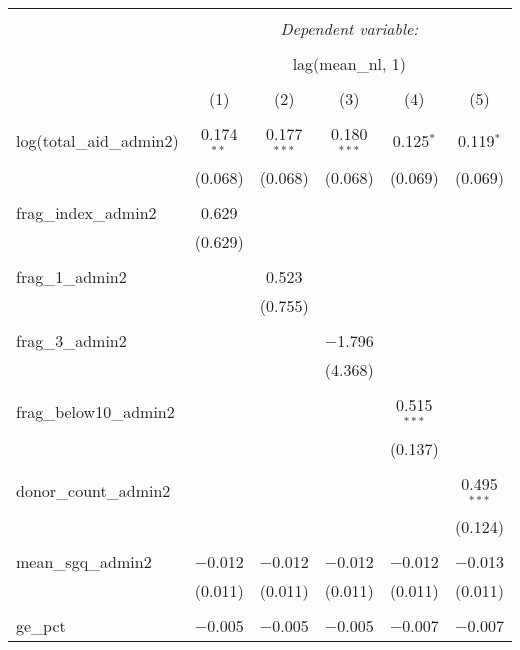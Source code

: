 
\begin{table}[!htbp] \centering 
  \caption{} 
  \label{} 
\begin{tabular}{@{\extracolsep{5pt}}lccccc} 
\\[-1.8ex]\hline 
\hline \\[-1.8ex] 
 & \multicolumn{5}{c}{\textit{Dependent variable:}} \\ 
\cline{2-6} 
\\[-1.8ex] & \multicolumn{5}{c}{lag(mean\_nl, 1)} \\ 
\\[-1.8ex] & (1) & (2) & (3) & (4) & (5)\\ 
\hline \\[-1.8ex] 
 log(total\_aid\_admin2) & 0.174$^{**}$ & 0.177$^{***}$ & 0.180$^{***}$ & 0.125$^{*}$ & 0.119$^{*}$ \\ 
  & (0.068) & (0.068) & (0.068) & (0.069) & (0.069) \\ 
  & & & & & \\ 
 frag\_index\_admin2 & 0.629 &  &  &  &  \\ 
  & (0.629) &  &  &  &  \\ 
  & & & & & \\ 
 frag\_1\_admin2 &  & 0.523 &  &  &  \\ 
  &  & (0.755) &  &  &  \\ 
  & & & & & \\ 
 frag\_3\_admin2 &  &  & $-$1.796 &  &  \\ 
  &  &  & (4.368) &  &  \\ 
  & & & & & \\ 
 frag\_below10\_admin2 &  &  &  & 0.515$^{***}$ &  \\ 
  &  &  &  & (0.137) &  \\ 
  & & & & & \\ 
 donor\_count\_admin2 &  &  &  &  & 0.495$^{***}$ \\ 
  &  &  &  &  & (0.124) \\ 
  & & & & & \\ 
 mean\_sgq\_admin2 & $-$0.012 & $-$0.012 & $-$0.012 & $-$0.012 & $-$0.013 \\ 
  & (0.011) & (0.011) & (0.011) & (0.011) & (0.011) \\ 
  & & & & & \\ 
 ge\_pct & $-$0.005 & $-$0.005 & $-$0.005 & $-$0.007 & $-$0.007 \\ 

\end{tabular}
\end{table}
